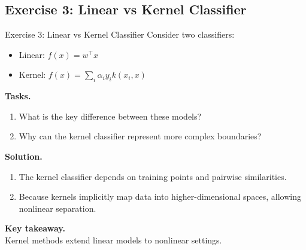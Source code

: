 \documentclass[aspectratio=169,11pt]{beamer}
\begin{document}
\subsection{Exercise 3: Linear vs Kernel Classifier}
\begin{frame}[t,allowframebreaks]{Exercise 3: Linear vs Kernel Classifier}
\small
Consider two classifiers:

\begin{itemize}
    \item Linear: $f(x) = w^\top x$
    \item Kernel: $f(x) = \sum_i \alpha_i y_i k(x_i, x)$
\end{itemize}

\textbf{Tasks.}\\ \begin{enumerate}
    \item What is the key difference between these models?
    \item Why can the kernel classifier represent more complex boundaries?
\end{enumerate}

\textbf{Solution.}\\ \begin{enumerate}
\item The kernel classifier depends on training points and pairwise similarities.

\item Because kernels implicitly map data into higher-dimensional spaces, allowing nonlinear separation.
\end{enumerate}

\textbf{Key takeaway.}\\ Kernel methods extend linear models to nonlinear settings.
\end{frame}
\end{document}
